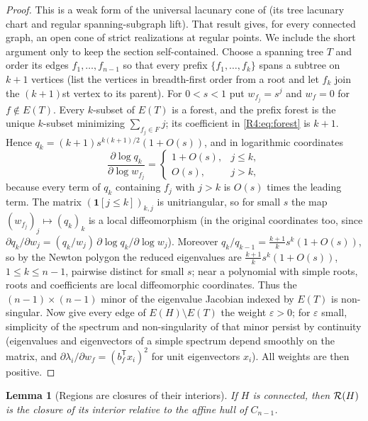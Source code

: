 \documentclass[11pt]{amsart}
\newtheorem{lemma}[theorem]{Lemma}
\theoremstyle{definition}
\theoremstyle{remark}
\begin{document}
\begin{proof}
This is a weak form of the universal lacunary cone of \cite{K-016} (its
tree lacunary chart and regular spanning-subgraph lift).  That result gives,
for every connected graph, an open cone of strict realizations at regular
points.  We include the short argument only to keep the section
self-contained.  Choose a spanning tree $T$ and order its edges $f_1,\dots,f_{n-1}$ so that
every prefix $\{f_1,\dots,f_k\}$ spans a subtree on $k+1$ vertices (list
the vertices in breadth-first order from a root and let $f_k$ join the
$(k+1)$st vertex to its parent).  For $0<s<1$ put $w_{f_j}=s^{j}$ and
$w_f=0$ for $f\notin E(T)$.  Every $k$-subset of $E(T)$ is a forest, and
the prefix forest is the unique $k$-subset minimizing $\sum_{f_j\in F}j$;
its coefficient in \eqref{R4:eq:forest} is $k+1$.  Hence
$q_k=(k+1)s^{k(k+1)/2}(1+O(s))$, and in logarithmic coordinates
\[
 \frac{\partial\log q_k}{\partial\log w_{f_j}}
 =\begin{cases}1+O(s),&j\le k,\\ O(s),&j>k,\end{cases}
\]
because every term of $q_k$ containing $f_j$ with $j>k$ is $O(s)$ times
the leading term.  The matrix $(\mathbf 1[j\le k])_{k,j}$ is unitriangular,
so for small $s$ the map $(w_{f_j})_j\mapsto(q_k)_k$ is a local
diffeomorphism (in the original coordinates too, since
$\partial q_k/\partial w_j=(q_k/w_j)\,\partial\log q_k/\partial\log w_j$).
Moreover $q_k/q_{k-1}=\frac{k+1}{k}s^{k}(1+O(s))$, so by the Newton
polygon the reduced eigenvalues are $\frac{k+1}{k}s^{k}(1+O(s))$,
$1\le k\le n-1$, pairwise distinct for small $s$; near a polynomial with
simple roots, roots and coefficients are local diffeomorphic coordinates.
Thus the $(n-1)\times(n-1)$ minor of the eigenvalue Jacobian indexed by
$E(T)$ is non-singular.  Now give every edge of $E(H)\setminus E(T)$ the
weight $\varepsilon>0$; for $\varepsilon$ small, simplicity of the
spectrum and non-singularity of that minor persist by continuity
(eigenvalues and eigenvectors of a simple spectrum depend smoothly on the
matrix, and $\partial\lambda_i/\partial w_f=(b_f^{\mathsf T}x_i)^2$ for
unit eigenvectors $x_i$).  All weights are then positive.
\end{proof}

\begin{lemma}[Regions are closures of their interiors]\label{R4:lem:interior}
If $H$ is connected, then $\mathcal{R}(H)$ is the closure of its interior
relative to the affine hull of $C_{n-1}$.
\end{lemma}
\end{document}
